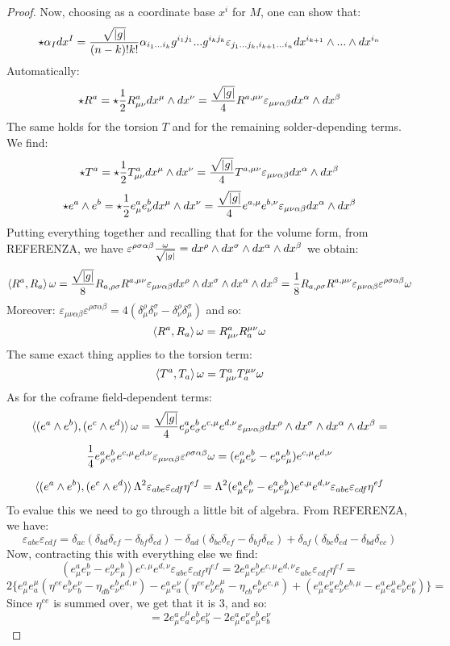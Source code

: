 \documentclass[12pt,a4paper]{report}
\theoremstyle{definition}
\theoremstyle{Theorem}
\theoremstyle{definition}
\theoremstyle{definition}
\begin{document}
\begin{proof}
		Now, choosing as a coordinate base ${x^i}$ for $M$, one can show that:
		$$\star \alpha_Idx^I={\sqrt{|g|}\over (n-k)!k!}\alpha_{i_1...i_k}g^{i_1j_1}...g^{i_kj_k}\varepsilon_{j_1...j_k,i_{k+1}...i_n}dx^{i_{k+1}}\wedge...\wedge dx^{i_n}$$
		Automatically:
		$$\star R^a=\star{1\over 2} R^a_{\mu\nu}dx^\mu\wedge dx^\nu={\sqrt{|g|}\over 4}R^{a,\mu\nu}\varepsilon_{\mu\nu\alpha\beta}dx^\alpha\wedge dx^\beta$$
		The same holds for the torsion $T$ and for the remaining solder-depending terms. We find:
		$$\star T^a=\star{1\over 2} T^a_{\mu\nu}dx^\mu\wedge dx^\nu={\sqrt{|g|}\over 4}T^{a,\mu\nu}\varepsilon_{\mu\nu\alpha\beta}dx^\alpha\wedge dx^\beta$$
		$$\star e^a\wedge e^b=\star{1\over 2} e^a_{\mu} e^b_{\nu}dx^\mu\wedge dx^\nu={\sqrt{|g|}\over 4}e^{a,\mu} e^{b,\nu}\varepsilon_{\mu\nu\alpha\beta}dx^\alpha\wedge dx^\beta$$
		Putting everything together and recalling that for the volume form, from REFERENZA, we have $\varepsilon^{\rho\sigma\alpha\beta}{\omega\over \sqrt{|g|}}=dx^\rho\wedge dx^\sigma \wedge dx^\alpha\wedge dx^\beta$ we obtain:
		$$\braket{R^a,R_a}\omega={\sqrt{|g|}\over8}R_{a,\rho\sigma}R^{a,\mu\nu}\varepsilon_{\mu\nu\alpha\beta}dx^\rho\wedge dx^\sigma \wedge dx^\alpha\wedge dx^\beta={1\over8}R_{a,\rho\sigma}R^{a,\mu\nu}\varepsilon_{\mu\nu\alpha\beta}\varepsilon^{\rho\sigma\alpha\beta}\omega$$
		Moreover: $\varepsilon_{\mu\nu\alpha\beta}\varepsilon^{\rho\sigma\alpha\beta}=4(\delta^\rho_\mu \delta^\sigma_\nu-\delta^\rho_\nu \delta^\sigma_\mu)$ and so:
		$$\braket{R^a,R_a}\omega=R^a_{\mu\nu}R_a^{\mu\nu}\omega$$
		The same exact thing applies to the torsion term:
		$$\braket{T^a,T_a}\omega=T^a_{\mu\nu}T_a^{\mu\nu}\omega$$
		As for the coframe field-dependent terms:
		$$\braket{(e^a\wedge e^b),(e^c\wedge e^d)}\omega={\sqrt{|g|}\over 4}e^a_\rho e^b_\sigma e^{c,\mu} e^{d,\nu}\varepsilon_{\mu\nu\alpha\beta}dx^\rho\wedge dx^\sigma \wedge  dx^\alpha\wedge dx^\beta=$$
		$${1\over 4}e^a_\rho e^b_\sigma e^{c,\mu} e^{d,\nu}\varepsilon_{\mu\nu\alpha\beta}\varepsilon^{\rho\sigma\alpha\beta}\omega=(e^a_\mu e^b_\nu-e^a_\nu e^b_\mu) e^{c,\mu} e^{d,\nu}$$
		
		$$\braket{(e^a\wedge e^b),(e^c\wedge e^d)}\Lambda^2\varepsilon_{abe}\varepsilon_{cdf}\eta^{ef}=\Lambda^2(e^a_\mu e^b_\nu-e^a_\nu e^b_\mu) e^{c,\mu} e^{d,\nu}\varepsilon_{abe}\varepsilon_{cdf}\eta^{ef}$$
		To evalue this we need to go through a little bit of algebra. From REFERENZA, we have:
		$$\varepsilon_{abe}\varepsilon_{cdf}=\delta_{ac}(\delta_{bd}\delta_{ef}-\delta_{bf}\delta_{ed})-\delta_{ad}(\delta_{bc}\delta_{ef}-\delta_{bf}\delta_{ec})+\delta_{af}(\delta_{bc}\delta_{ed}-\delta_{bd}\delta_{ec})$$
		Now, contracting this with everything else we find:
		$$(e^a_\mu e^b_\nu-e^a_\nu e^b_\mu) e^{c,\mu} e^{d,\nu}\varepsilon_{abe}\varepsilon_{cdf}\eta^{ef}=2e^a_\mu e^b_\nu e^{c,\mu} e^{d,\nu}\varepsilon_{abe}\varepsilon_{cdf}\eta^{ef}=$$
		$$2\bigg\{
			e^a_\mu e_a^{\mu}(\eta^{ee}e^b_\nu e_b^{\nu}-\eta_{db}e^b_\nu e^{d,\nu})-e^a_\mu e_a^{\nu}(\eta^{ee}e^b_\nu e_b^{\mu}-\eta_{cb}e^b_\nu e^{c,\mu})+(e^a_\mu e_a^\nu e^b_\nu e^{b,\mu}-e^a_\mu e_a^\mu e^b_\nu e_b^\nu) \bigg\}=$$
		Since $\eta^{ee}$ is summed over, we get that it is 3, and so:
		$$=2e^a_\mu e^\mu_ae_\nu^b e^\nu_b-2e^a_\mu e^\nu_ae_\mu^b e^\nu_b$$
	\end{proof}
\end{document}
